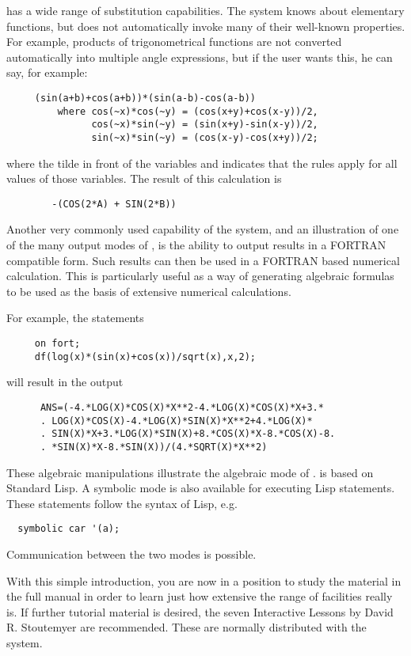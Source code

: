 {\REDUCE} has a wide range of substitution capabilities. The system knows
about elementary functions, but does not automatically invoke many of their
well-known properties. For example, products of trigonometrical functions
are not converted automatically into multiple angle expressions, but if the
user wants this, he can say, for example:
\begin{verbatim}
     (sin(a+b)+cos(a+b))*(sin(a-b)-cos(a-b))
         where cos(~x)*cos(~y) = (cos(x+y)+cos(x-y))/2,
               cos(~x)*sin(~y) = (sin(x+y)-sin(x-y))/2,
               sin(~x)*sin(~y) = (cos(x-y)-cos(x+y))/2;
\end{verbatim}
where the tilde in front of the variables  and  indicates
that the rules apply for all values of those variables.
The result of this calculation is
\begin{verbatim}
        -(COS(2*A) + SIN(2*B))
\end{verbatim}

Another very commonly used capability of the system, and an illustration
of one of the many output modes of {\REDUCE}, is the ability to output
results in a FORTRAN compatible form.  Such results can then be used in a
FORTRAN based numerical calculation.  This is particularly useful as a way
of generating algebraic formulas to be used as the basis of extensive
numerical calculations.

For example, the statements
\begin{verbatim}
     on fort;
     df(log(x)*(sin(x)+cos(x))/sqrt(x),x,2);
\end{verbatim}
will result in the output
\begin{small}
\begin{verbatim}
      ANS=(-4.*LOG(X)*COS(X)*X**2-4.*LOG(X)*COS(X)*X+3.*
      . LOG(X)*COS(X)-4.*LOG(X)*SIN(X)*X**2+4.*LOG(X)*
      . SIN(X)*X+3.*LOG(X)*SIN(X)+8.*COS(X)*X-8.*COS(X)-8.
      . *SIN(X)*X-8.*SIN(X))/(4.*SQRT(X)*X**2)
\end{verbatim}
\end{small}
These algebraic manipulations illustrate the algebraic mode of {\REDUCE}.
{\REDUCE} is based on Standard Lisp. A symbolic mode is also available for
executing Lisp statements. These statements follow the syntax of Lisp,
e.g.
\begin{verbatim}
  symbolic car '(a);
\end{verbatim}
Communication between the two modes is possible.

With this simple introduction, you are now in a position to study the
material in the full {\REDUCE} manual in order to learn just how extensive
the range of facilities really is.  If further tutorial material is
desired, the seven {\REDUCE} Interactive Lessons by David R. Stoutemyer are
recommended.  These are normally distributed with the system.

